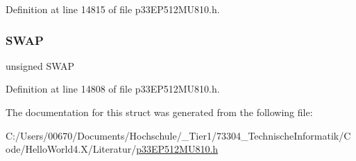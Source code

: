 Definition at line 14815 of file p33\+E\+P512\+M\+U810.\+h.

\mbox{\label{structtag_i_o_c_o_n4_b_i_t_s_a3ed0654ceb192d32e26d2929c9b8dcc2}} 
\subsubsection{\texorpdfstring{S\+W\+AP}{SWAP}}
{\footnotesize\ttfamily unsigned S\+W\+AP}



Definition at line 14808 of file p33\+E\+P512\+M\+U810.\+h.



The documentation for this struct was generated from the following file\+:\begin{DoxyCompactItemize}
\item 
C\+:/\+Users/00670/\+Documents/\+Hochschule/\+\_\+\+Tier1/73304\+\_\+\+Technische\+Informatik/\+Code/\+Hello\+World4.\+X/\+Literatur/\hyperlink{p33_e_p512_m_u810_8h}{p33\+E\+P512\+M\+U810.\+h}\end{DoxyCompactItemize}
